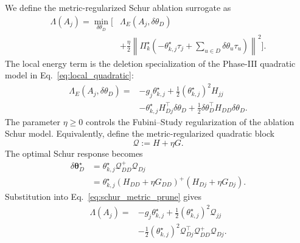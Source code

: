\documentclass[
  reprint,
  amsmath,
  amssymb,
  aps,
  pra,
  nofootinbib,
  superscriptaddress,
  floatfix
]{revtex4-2}
\begin{document}
We define the metric-regularized Schur ablation surrogate as
\begin{equation}
\begin{aligned}
\Lambda(A_j)
=
\min_{\delta\theta_D}
\Biggl[
&\Lambda_E(A_j,\delta\theta_D)
\\
&+
\frac{\eta}{2}
\left\|
\Pi_k^\star
\left(
-\theta_{k,j}^\star\tau_j
+
\sum_{u\in D}\delta\theta_u\tau_u
\right)
\right\|^2
\Biggr].
\end{aligned}
\label{eq:schur_metric_prune}
\end{equation}
The local energy term is the deletion specialization of the Phase-III
quadratic model in Eq.~\eqref{eq:local_quadratic}:
\begin{equation}
\begin{aligned}
\Lambda_E(A_j,\delta\theta_D)
={}&
-g_j\theta_{k,j}^\star
+
\frac12(\theta_{k,j}^\star)^2H_{jj}
\\
&-
\theta_{k,j}^\star H_{Dj}^{\top}\delta\theta_D
+
\frac12\delta\theta_D^{\top}H_{DD}\delta\theta_D .
\end{aligned}
\label{eq:lambda_schur_energy_loss}
\end{equation}
The parameter \(\eta\ge0\) controls the Fubini--Study regularization of the
ablation Schur model.  Equivalently, define the metric-regularized quadratic
block
\[
\mathcal Q:=H+\eta G .
\]
The optimal Schur response becomes
\begin{equation}
\begin{aligned}
\delta\boldsymbol\theta_D^\star
&=
\theta_{k,j}^\star
\mathcal Q_{DD}^{+}\mathcal Q_{Dj}
\\
&=
\theta_{k,j}^\star
\left(H_{DD}+\eta G_{DD}\right)^+
\left(H_{Dj}+\eta G_{Dj}\right).
\end{aligned}
\label{eq:ablation_schur_response}
\end{equation}
Substitution into Eq.~\eqref{eq:schur_metric_prune} gives
\begin{equation}
\begin{aligned}
\Lambda(A_j)
={}&
-g_j\theta_{k,j}^\star
+
\frac12(\theta_{k,j}^\star)^2\mathcal Q_{jj}
\\
&-
\frac12(\theta_{k,j}^\star)^2
\mathcal Q_{Dj}^{\top}
\mathcal Q_{DD}^{+}
\mathcal Q_{Dj}.
\end{aligned}
\label{eq:ablation_schur_loss}
\end{equation}
\end{document}
